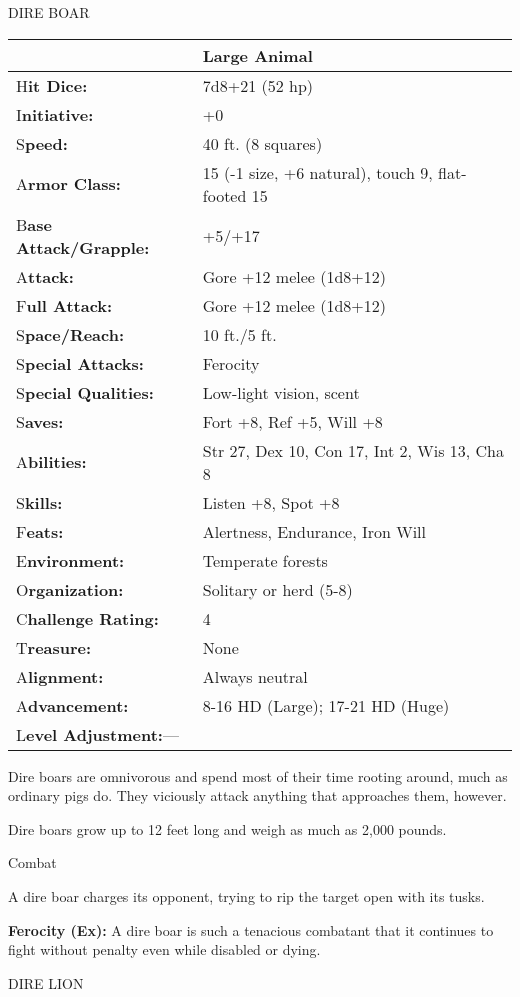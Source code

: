 \documentclass{article}
\begin{document}
\vspace{12pt}
DIRE BOAR

\begin{tabular}{|>{\raggedright}p{91pt}|>{\raggedright}p{186pt}|}
\hline
  & Large Animal\tabularnewline
\hline
H\textbf{it Dice:} & 7d8+21 (52 hp)\tabularnewline
\hline
I\textbf{nitiative:} & +0\tabularnewline
\hline
S\textbf{peed:} & 40 ft. (8 squares)\tabularnewline
\hline
A\textbf{rmor Class:} & 15 (-1 size, +6 natural), touch 9, flat-footed 15\tabularnewline
\hline
B\textbf{ase Attack/Grapple:} & +5/+17\tabularnewline
\hline
A\textbf{ttack:} & Gore +12 melee (1d8+12)\tabularnewline
\hline
F\textbf{ull Attack:} & Gore +12 melee (1d8+12)\tabularnewline
\hline
S\textbf{pace/Reach:} & 10 ft./5 ft.\tabularnewline
\hline
S\textbf{pecial Attacks:} & Ferocity\tabularnewline
\hline
S\textbf{pecial Qualities:} & Low-light vision, scent\tabularnewline
\hline
S\textbf{aves:} & Fort +8, Ref +5, Will +8\tabularnewline
\hline
A\textbf{bilities:} & Str 27, Dex 10, Con 17, Int 2, Wis 13, Cha 8\tabularnewline
\hline
S\textbf{kills:} & Listen +8, Spot +8\tabularnewline
\hline
F\textbf{eats:} & Alertness, Endurance, Iron Will\tabularnewline
\hline
E\textbf{nvironment:} & Temperate forests\tabularnewline
\hline
O\textbf{rganization:} & Solitary or herd (5-8)\tabularnewline
\hline
C\textbf{hallenge Rating:} & 4\tabularnewline
\hline
T\textbf{reasure:} & None\tabularnewline
\hline
A\textbf{lignment:} & Always neutral\tabularnewline
\hline
A\textbf{dvancement:} & 8-16 HD (Large); 17-21 HD (Huge)\tabularnewline
\hline
L\textbf{evel Adjustment:}--- & \tabularnewline
\hline
\end{tabular}

Dire boars are omnivorous and spend most of their time rooting around, much as 
ordinary pigs do. They viciously attack anything that approaches them, however.

Dire boars grow up to 12 feet long and weigh as much as 2,000 pounds.

Combat

A dire boar charges its opponent, trying to rip the target open with its tusks.

\textbf{Ferocity (Ex):} A dire boar is such a tenacious combatant that it continues 
to fight without penalty even while disabled or dying.

\vspace{12pt}
DIRE LION
\end{document}
